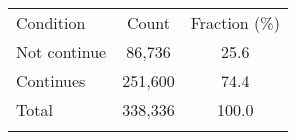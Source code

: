 \begin{center}
\begin{tabular}{lcc}
\hline \noalign{\smallskip}Condition & Count & Fraction (\%)\\
\noalign{\smallskip}\hline \noalign{\smallskip}Not continue & 86,736 & 25.6\\
Continues & 251,600 & 74.4\\
Total & 338,336 & 100.0\\
\noalign{\smallskip}\hline\end{tabular}\\
\end{center}
